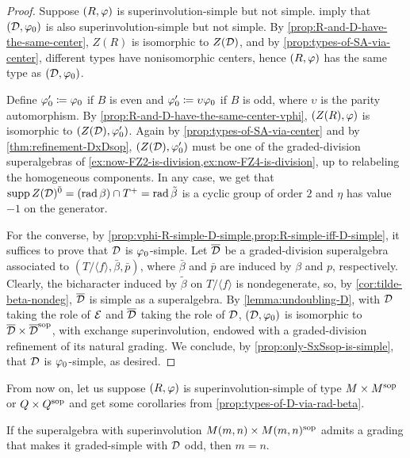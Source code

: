 \begin{proof}
    Suppose $(R, \varphi)$ is superinvolution-simple but not simple. 
     imply that $(\mathcal{D}, \varphi_0)$ is also superinvolution-simple but not simple. 
    By \cref{prop:R-and-D-have-the-same-center}, $Z(R)$ is isomorphic to $Z(\mathcal{D})$, and by \cref{prop:types-of-SA-via-center}, different types have nonisomorphic centers, hence $(R, \varphi)$ has the same type as $(\mathcal{D}, \varphi_0)$. 
    
    Define $\varphi_0' \coloneqq \varphi_0$ if $B$ is even and $\varphi_0' \coloneqq \upsilon\varphi_0$ if $B$ is odd, where $\upsilon$ is the parity automorphism. 
    By \cref{prop:R-and-D-have-the-same-center-vphi}, $(Z(R), \varphi)$ is isomorphic to $(Z(\mathcal{D}), \varphi_0')$. 
    Again by  \cref{prop:types-of-SA-via-center} and by \cref{thm:refinement-DxDsop}, 
    $(Z(\mathcal{D}), \varphi_0')$ must be one of the graded-division superalgebras of \cref{ex:now-FZ2-is-division,ex:now-FZ4-is-division}, up to relabeling the homogeneous components. 
    In any case, we get that $\operatorname{supp} Z(\mathcal{D})^{\bar0} = (\operatorname{rad} \beta) \cap T^+ = \operatorname{rad} \tilde\beta$ is a cyclic group of order $2$ and $\eta$ has value $-1$ on the generator. 
    
    For the converse, by \cref{prop:vphi-R-simple-D-simple,prop:R-simple-iff-D-simple}, it suffices to prove that $\mathcal{D}$ is $\varphi_0$-simple. 
    Let $\barr \D$ be a graded-division superalgebra associated to $(T / \langle f \rangle, \bar \beta, \bar p)$, where $\bar \beta$ and $\bar p$ are induced by $\beta$ and $p$, respectively. 
    Clearly, the bicharacter induced by $\tilde\beta$ on $T / \langle f \rangle$ is nondegenerate, so, by \cref{cor:tilde-beta-nondeg}, $\barr \D$ is simple as a superalgebra. 
    By \cref{lemma:undoubling-D}, with $\mathcal{D}$ taking the role of $\mathcal E$ and $\overline{\mathcal{D}}$ taking the role of $\mathcal{D}$, $(\mathcal{D}, \varphi_0)$ is isomorphic to $\barr \D \times \barr \D\sop$, with exchange superinvolution, endowed with a  graded-division refinement of its natural grading.
    We conclude, by \cref{prop:only-SxSsop-is-simple}, that $\mathcal{D}$ is $\varphi_0$-simple, as desired. 
\end{proof}

From now on, let us suppose $(R,\varphi)$ is superinvolution-simple of type $M\times M^{\mathrm{sop}}$ or $Q\times Q^{\mathrm{sop}}$ and get some corollaries from \cref{prop:types-of-D-via-rad-beta}. 

\begin{cor}\label{cor:associative-type-II-odd-m=n}
    If the superalgebra with superinvolution $M(m,n) \times M(m,n)^{\mathrm{sop}}$ admits a grading that makes it graded-simple with $\mathcal{D}$ odd, then $m = n$.
\end{cor}

